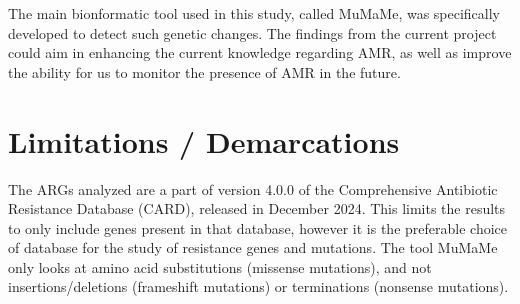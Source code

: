 
The main bionformatic tool used in this study, called MuMaMe\cite{magesh2019MumameSoftwareTool}, was specifically developed to detect such genetic changes. 
The findings from the current project could aim in enhancing the current knowledge regarding AMR, as well as improve the ability for us to monitor the presence of AMR in the future. 




\section{Limitations / Demarcations}
The ARGs analyzed are a part of version 4.0.0 of the Comprehensive Antibiotic Resistance Database (CARD)\cite{alcock2023CARD2023Expanded}, released in December 2024. This limits the results to only include genes present in that database, however it is the preferable choice of database for the study of resistance genes and mutations\cite{papp2022ReviewComparisonAntimicrobial}.
The tool MuMaMe only looks at amino acid substitutions (missense mutations), and not insertions/deletions (frameshift mutations) or terminations (nonsense mutations)\cite{liu2024Chapter106Virus}. 



